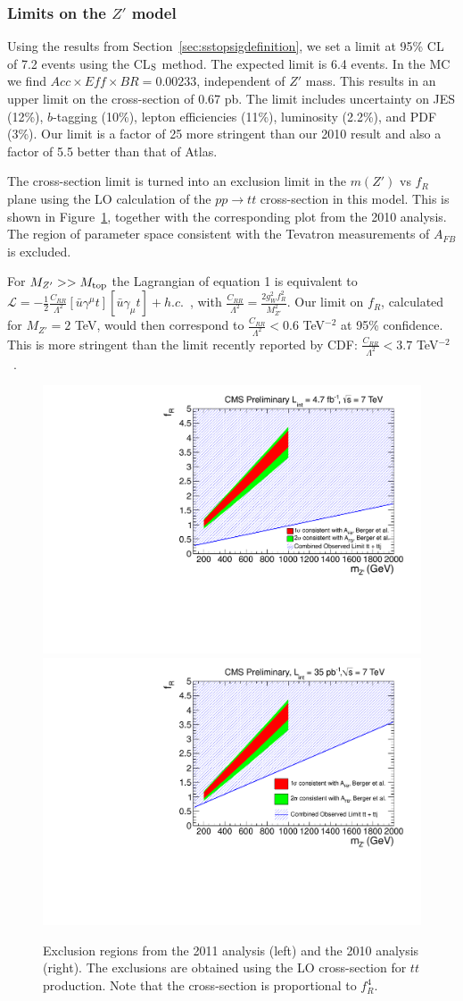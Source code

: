 \subsubsection{Limits on the $Z'$ model}
\label{sec:sstopslimits}
Using the results from Section~\ref{sec:sstopsigdefinition}, we set 
a limit at 95\% CL of 7.2 events using the CL$_{\rm S}$ method.
The expected limit is 6.4 events.
In the MC we find $Acc \times Eff \times BR = 0.00233$, independent of $Z'$ mass. 
This results in an upper limit on the cross-section of 0.67 pb.
The limit includes uncertainty
on JES (12\%), $b$-tagging (10\%), lepton efficiencies (11\%), luminosity (2.2\%),
and PDF (3\%).
Our limit is a factor of 25 more stringent than our
2010 result\cite{sstop} and also a factor of 5.5 better
than that of Atlas\cite{sstopatlas}.

The cross-section limit is turned into an exclusion limit in the $m(Z')$ vs $f_R$
plane using the LO calculation of the $pp \to tt$ cross-section in this model.
This is shown in Figure~\ref{fig:sstopexclusion}, together with the corresponding
plot from the 2010 analysis.  The region of parameter space consistent 
with the Tevatron measurements of $A_{FB}$ is excluded.


For $M_{Z'} >> M_{\rm top}$ the Lagrangian of equation 1 is 
equivalent to 
$\mathcal{L} = -\frac{1}{2}\frac{C_{RR}}{\Lambda^2}
 [\bar{u} \gamma^\mu t][\bar{u} \gamma_{\mu} t] + h.c.$~\cite{cdfth2},
with $\frac{C_{RR}}{\Lambda^2} = \frac{2 g_W^2 f_R^2}{M_{Z'}^2}$.
 Our limit on $f_R$, calculated for $M_{Z'}=2$ TeV, 
would then correspond to $\frac{C_{RR}}{\Lambda^2} < 0.6$ TeV$^{-2}$ at 
95\% confidence.  This is more stringent than the limit recently reported
by CDF: $\frac{C_{RR}}{\Lambda^2} < 3.7$ TeV$^{-2}$~\cite{cdflimit}.


\begin{figure}[htb]
\begin{center}
\includegraphics[width=0.45\linewidth]{figs/zprimecombined.pdf}
\includegraphics[width=0.45\linewidth]{figs/sscomb.pdf}
\caption{Exclusion regions from the 2011 analysis (left) and the 2010 analysis (right).
The exclusions are obtained using the LO cross-section for $tt$ production.  
Note that the cross-section is proportional to $f_R^4$.
\label{fig:sstopexclusion}}
\end{center}
\end{figure}

